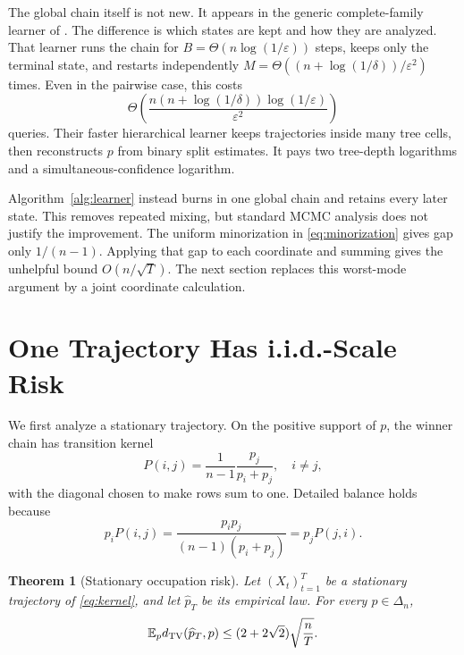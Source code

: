 \documentclass[twoside]{article}
\newtheorem{theorem}{Theorem}
\newcommand{\E}{\mathbb E}
\newcommand{\TV}{d_{\rm TV}}
\begin{document}
The global chain itself is not new. It appears in the generic complete-family learner of \citet{kleinberg2026providers}. The difference is which states are kept and how they are analyzed. That learner runs the chain for $B=\Theta(n\log(1/\varepsilon))$ steps, keeps only the terminal state, and restarts independently $M=\Theta((n+\log(1/\delta))/\varepsilon^2)$ times. Even in the pairwise case, this costs \[ \Theta\!\left( \frac{n(n+\log(1/\delta))\log(1/\varepsilon)}{\varepsilon^2} \right) \] queries. Their faster hierarchical learner keeps trajectories inside many tree cells, then reconstructs $p$ from binary split estimates. It pays two tree-depth logarithms and a simultaneous-confidence logarithm.

Algorithm~\ref{alg:learner} instead burns in one global chain and retains every later state. This removes repeated mixing, but standard MCMC analysis does not justify the improvement. The uniform minorization in \eqref{eq:minorization} gives gap only $1/(n-1)$. Applying that gap to each coordinate and summing gives the unhelpful bound $O(n/\sqrt T)$. The next section replaces this worst-mode argument by a joint coordinate calculation.

\section{One Trajectory Has i.i.d.-Scale Risk}
\label{sec:risk}

We first analyze a stationary trajectory. On the positive support of $p$, the winner chain has transition kernel
\begin{equation}
 P(i,j)=\frac1{n-1}\frac{p_j}{p_i+p_j},\quad i\ne j,
 \label{eq:kernel}
\end{equation}
with the diagonal chosen to make rows sum to one. Detailed balance holds because
\begin{equation}
 p_iP(i,j)=\frac{p_ip_j}{(n-1)(p_i+p_j)}=p_jP(j,i).
 \label{eq:balance}
\end{equation}

\begin{theorem}[Stationary occupation risk]
\label{thm:risk}
Let $(X_t)_{t=1}^T$ be a stationary trajectory of \eqref{eq:kernel}, and let $\widehat p_T$ be its empirical law. For every $p\in\Delta_n$,
\begin{equation}
 \E_p\TV(\widehat p_T,p)
 \le (2+2\sqrt2)\sqrt{\frac nT}.
 \label{eq:risk}
\end{equation}
\end{theorem}
\end{document}
